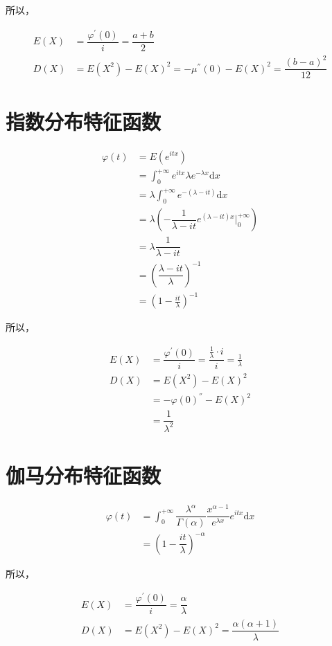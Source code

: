 \documentclass[12pt, a4paper, oneside]{ctexbook}
\begin{document}
所以，

\begin{align*}
    E(X) &= \dfrac{\varphi^{'}(0)}{i} = \dfrac{a + b}{2}\\
    D(X) &= E(X^{2}) - E(X)^{2} = -\mu^{''}(0) - E(X)^{2} = \dfrac{(b-a)^{{2}}}{12}
\end{align*}
\section{指数分布特征函数}
\begin{align*}
\varphi(t) &= E(e^{itx}) \\
&= \int_0^{+\infty} e^{itx} \lambda e^{-\lambda x}\mathrm d{x} \\
&= \lambda \int_0^{+\infty} e^{-(\lambda - it)} \mathrm{d}x \\
&= \lambda(-\dfrac{1}{\lambda - it}e^{(\lambda - it)x} |_0^{+\infty}) \\
&= \lambda \dfrac{1}{\lambda - it} \\
&= \left( \dfrac{\lambda - it}{\lambda}\right)^{-1} \\
&= (1 - \frac{it}{\lambda})^{-1}
\end{align*}

所以，

\begin{align*}
E(X) &= \dfrac{\varphi^{'}(0) }{i} = \dfrac{\frac{1}{\lambda}\cdot i }{i}  =\frac{1}{\lambda} \\
D(X) &= E(X^{2}) - E(X)^{2} \\
&= -\varphi(0)^{''} - E(X)^{2} \\
&= \dfrac{1}{\lambda^{2}}
\end{align*}

\section{伽马分布特征函数}
\begin{align*}
\varphi(t) &= \int_0^{+\infty} \dfrac{\lambda^{\alpha}}{\Gamma(\alpha)} \dfrac{x^{\alpha - 1}}{e^{\lambda x}} e^{itx} \mathrm{d} x \\
&= (1 - \dfrac{it}{\lambda})^{-\alpha}
\end{align*}

所以，

\begin{align*}
    E(X) &= \dfrac{\varphi^{'}(0) }{i} = \dfrac{\alpha}{\lambda}\\
    D(X) &= E(X^{2}) - E(X)^{2} = \dfrac{\alpha(\alpha + 1)}{\lambda}
\end{align*}
\end{document}
